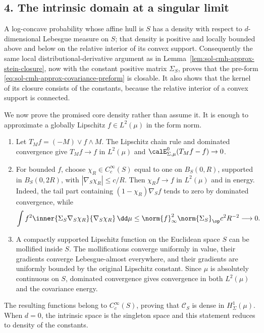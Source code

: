 \documentclass[../main.tex]{subfiles}
\begin{document}
\subsection*{4. The intrinsic domain at a singular limit}

A log-concave probability whose affine hull is $S$ has a density with respect to
$d$-dimensional Lebesgue measure on $S$; that density is positive and locally bounded above and
below on the relative interior of its convex support.  Consequently the same local
distributional-derivative argument as in
Lemma~\ref{lem:sol-cmh-approx-stein-closure}, now with the constant positive matrix
$\Sigma_S$, proves that the pre-form
\eqref{eq:sol-cmh-approx-covariance-preform} is closable.  It also shows that the kernel of its
closure consists of the constants, because the relative interior of a convex support is
connected.

We now prove the promised core density rather than assume it.  It is enough to approximate a
globally Lipschitz $f\in L^2(\mu)$ in the form norm.
\begin{enumerate}[label=(\arabic*),leftmargin=2.2em]
  \item Let $T_Mf=(-M)\vee f\wedge M$.  The Lipschitz chain rule and dominated convergence give
        $T_Mf\to f$ in $L^2(\mu)$ and
        $\calE_{\Sigma,\mu}^0(T_Mf-f)\to0$.
  \item For bounded $f$, choose $\chi_R\in C_c^\infty(S)$ equal to one on $B_S(0,R)$,
        supported in $B_S(0,2R)$, with $|\nabla_S\chi_R|\le c/R$.  Then
        $\chi_Rf\to f$ in $L^2(\mu)$ and in energy.  Indeed, the tail part containing
        $(1-\chi_R)\nabla_Sf$ tends to zero by dominated convergence, while
        \[
          \int f^2\inner{\Sigma_S\nabla_S\chi_R}{\nabla_S\chi_R}\,\dd\mu
          \le \norm{f}_\infty^2\norm{\Sigma_S}_\op c^2R^{-2}\longrightarrow0.
        \]
  \item A compactly supported Lipschitz function on the Euclidean space $S$ can be mollified
        inside $S$.  The mollifications converge uniformly in value, their gradients converge
        Lebesgue-almost everywhere, and their gradients are uniformly bounded by the original
        Lipschitz constant.  Since $\mu$ is absolutely continuous on $S$, dominated convergence
        gives convergence in both $L^2(\mu)$ and the covariance energy.
\end{enumerate}
The resulting functions belong to $C_c^\infty(S)$, proving that
$\mathscr C_S$ is dense in $H^1_\Sigma(\mu)$.  When $d=0$, the intrinsic space is the singleton
space and this statement reduces to density of the constants.
\end{document}

